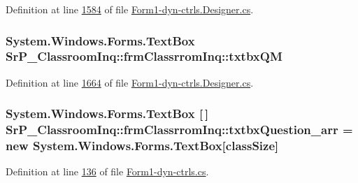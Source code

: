 \-Definition at line \hyperlink{_form1-dyn-ctrls_8_designer_8cs_source_l01584}{1584} of file \hyperlink{_form1-dyn-ctrls_8_designer_8cs_source}{\-Form1-\/dyn-\/ctrls.\-Designer.\-cs}.

\hypertarget{class_sr_p___classroom_inq_1_1frm_classrrom_inq_a4a85095c6aa75b21689e40d7dc78ace6}{
\subsubsection[{txtbx\-Q\-M}]{\setlength{\rightskip}{0pt plus 5cm}\-System.\-Windows.\-Forms.\-Text\-Box {\bf \-Sr\-P\-\_\-\-Classroom\-Inq\-::frm\-Classrrom\-Inq\-::txtbx\-Q\-M}}}
\label{class_sr_p___classroom_inq_1_1frm_classrrom_inq_a4a85095c6aa75b21689e40d7dc78ace6}


\-Definition at line \hyperlink{_form1-dyn-ctrls_8_designer_8cs_source_l01664}{1664} of file \hyperlink{_form1-dyn-ctrls_8_designer_8cs_source}{\-Form1-\/dyn-\/ctrls.\-Designer.\-cs}.

\hypertarget{class_sr_p___classroom_inq_1_1frm_classrrom_inq_ac8b5f7f10341c6c43066881afcbbcaaa}{
\subsubsection[{txtbx\-Question\-\_\-arr}]{\setlength{\rightskip}{0pt plus 5cm}\-System.\-Windows.\-Forms.\-Text\-Box \mbox{[}$\,$\mbox{]} {\bf \-Sr\-P\-\_\-\-Classroom\-Inq\-::frm\-Classrrom\-Inq\-::txtbx\-Question\-\_\-arr} = new \-System.\-Windows.\-Forms.\-Text\-Box\mbox{[}{\bf class\-Size}\mbox{]}}}
\label{class_sr_p___classroom_inq_1_1frm_classrrom_inq_ac8b5f7f10341c6c43066881afcbbcaaa}


\-Definition at line \hyperlink{_form1-dyn-ctrls_8cs_source_l00136}{136} of file \hyperlink{_form1-dyn-ctrls_8cs_source}{\-Form1-\/dyn-\/ctrls.\-cs}.

